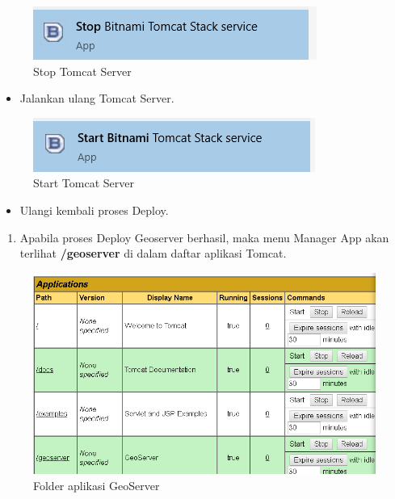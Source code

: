 \documentclass[]{book}
\providecommand{\tightlist}{%
  \setlength{\itemsep}{0pt}\setlength{\parskip}{0pt}}
\begin{document}
\begin{figure}

{\centering \includegraphics[width=0.4\linewidth]{images/08/gs111} 

}

\caption{Stop Tomcat Server}\label{fig:fig111}
\end{figure}

\begin{itemize}
\tightlist
\item
  Jalankan ulang Tomcat Server.
\end{itemize}

\begin{figure}

{\centering \includegraphics[width=0.4\linewidth]{images/08/gs112} 

}

\caption{Start Tomcat Server}\label{fig:fig112}
\end{figure}

\begin{itemize}
\tightlist
\item
  Ulangi kembali proses Deploy.
\end{itemize}

\begin{enumerate}
\def\labelenumi{\arabic{enumi}.}
\setcounter{enumi}{4}
\tightlist
\item
  Apabila proses Deploy Geoserver berhasil, maka menu Manager App akan terlihat \textbf{/geoserver} di dalam daftar aplikasi Tomcat.
\end{enumerate}

\begin{figure}

{\centering \includegraphics[width=0.4\linewidth]{images/08/gs39} 

}

\caption{Folder aplikasi GeoServer}\label{fig:fig39}
\end{figure}
\end{document}
